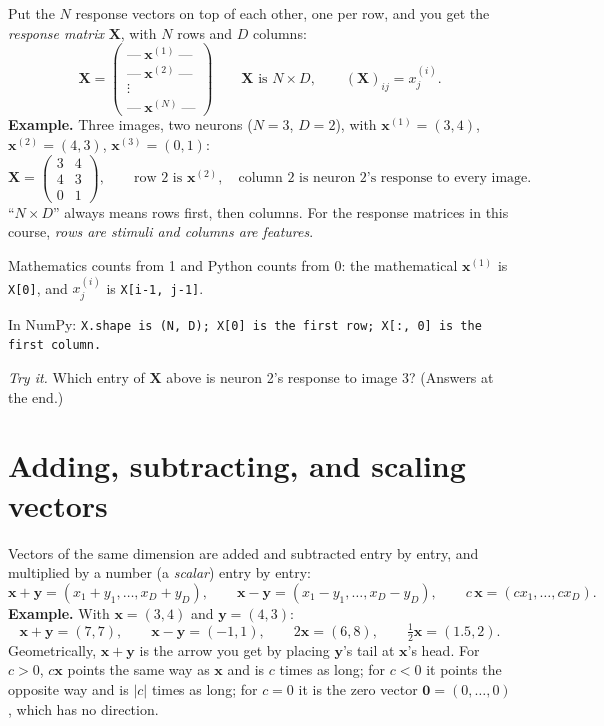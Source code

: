 \documentclass[11pt]{article}
\newcommand{\vx}{\bm{x}}
\newcommand{\vy}{\bm{y}}
\newcommand{\mX}{\bm{X}}
\newcommand{\np}[1]{{\small\color{lightgray}In NumPy: \texttt{#1}}\par}
\begin{document}
Put the $N$ response vectors on top of each other, one per row, and you get the
\emph{response matrix} $\mX$, with $N$ rows and $D$ columns:
\[
\mX =
\begin{pmatrix}
\text{---}\ \vx^{(1)}\ \text{---}\\
\text{---}\ \vx^{(2)}\ \text{---}\\
\vdots\\
\text{---}\ \vx^{(N)}\ \text{---}
\end{pmatrix}
\qquad
\mX \text{ is } N \times D, \qquad
(\mX)_{ij} = x^{(i)}_j .
\]
\textbf{Example.} Three images, two neurons ($N = 3$, $D = 2$), with
$\vx^{(1)} = (3, 4)$, $\vx^{(2)} = (4, 3)$, $\vx^{(3)} = (0, 1)$:
\[
\mX = \begin{pmatrix} 3 & 4 \\ 4 & 3 \\ 0 & 1 \end{pmatrix}, \qquad
\text{row 2 is } \vx^{(2)},\quad \text{column 2 is neuron 2's response to every image.}
\]
``$N \times D$'' always means rows first, then columns. For the response matrices in this
course, \emph{rows are stimuli and columns are features}.

Mathematics counts from 1 and Python counts from 0: the mathematical $\vx^{(1)}$ is
\texttt{X[0]}, and $x^{(i)}_j$ is \texttt{X[i-1, j-1]}.

\np{X.shape is (N, D); X[0] is the first row; X[:, 0] is the first column.}

\textit{Try it.} Which entry of $\mX$ above is neuron 2's response to image 3? (Answers at the end.)

\section{Adding, subtracting, and scaling vectors}

Vectors of the same dimension are added and subtracted entry by entry, and multiplied by
a number (a \emph{scalar}) entry by entry:
\[
\vx + \vy = (x_1 + y_1, \dots, x_D + y_D), \qquad
\vx - \vy = (x_1 - y_1, \dots, x_D - y_D), \qquad
c\,\vx = (c x_1, \dots, c x_D).
\]
\textbf{Example.} With $\vx = (3, 4)$ and $\vy = (4, 3)$:
\[
\vx + \vy = (7, 7), \qquad \vx - \vy = (-1, 1), \qquad 2\vx = (6, 8), \qquad
\tfrac{1}{2}\vx = (1.5, 2).
\]
Geometrically, $\vx + \vy$ is the arrow you get by placing $\vy$'s tail at $\vx$'s head.
For $c > 0$, $c\vx$ points the same way as $\vx$ and is $c$ times as long; for $c < 0$ it
points the opposite way and is $|c|$ times as long; for $c = 0$ it is the zero vector
$\bm{0} = (0, \dots, 0)$, which has no direction.
\end{document}
